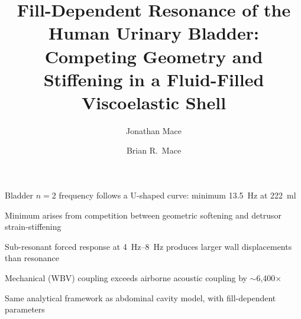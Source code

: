 \documentclass[review]{elsarticle}
\begin{document}
\begin{frontmatter}

\title{Fill-Dependent Resonance of the Human Urinary Bladder:\\ Competing Geometry and Stiffening in a Fluid-Filled Viscoelastic Shell}

\author[msr]{Jonathan Mace}

\author[auckland]{Brian R.\ Mace}



\begin{highlights}
\item Bladder $n{=}2$ frequency follows a U-shaped curve: minimum \SI{13.5}{\hertz} at \SI{222}{\milli\litre}
\item Minimum arises from competition between geometric softening and detrusor strain-stiffening
\item Sub-resonant forced response at \SIrange{4}{8}{\hertz} produces larger wall displacements than resonance
\item Mechanical (WBV) coupling exceeds airborne acoustic coupling by $\sim$6,400$\times$
\item Same analytical framework as abdominal cavity model, with fill-dependent parameters
\end{highlights}


\end{frontmatter}
\end{document}

